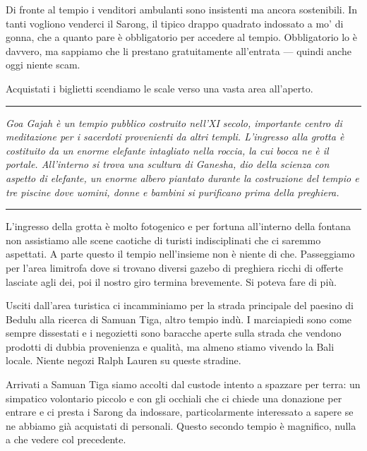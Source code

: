 Di fronte al tempio i venditori ambulanti sono insistenti ma ancora sostenibili. In tanti vogliono venderci il Sarong, il tipico drappo quadrato indossato a mo' di gonna, che a quanto pare è obbligatorio per accedere al tempio. Obbligatorio lo è davvero, ma sappiamo che li prestano gratuitamente all'entrata — quindi anche oggi niente scam. 

Acquistati i biglietti scendiamo le scale verso una vasta area all'aperto. 

\begin{center}
    \noindent\rule{0.6\textwidth}{0.4pt}
\end{center}

\textit{Goa Gajah è un tempio pubblico costruito nell'XI secolo, importante centro di meditazione per i sacerdoti provenienti da altri templi. L'ingresso alla grotta è costituito da un enorme elefante intagliato nella roccia, la cui bocca ne è il portale. All'interno si trova una scultura di Ganesha, dio della scienza con aspetto di elefante, un enorme albero piantato durante la costruzione del tempio e tre piscine dove uomini, donne e bambini si purificano prima della preghiera.}

\begin{center}
    \noindent\rule{0.6\textwidth}{0.4pt}
\end{center}

L'ingresso della grotta è molto fotogenico e per fortuna all'interno della fontana non assistiamo alle scene caotiche di turisti indisciplinati che ci saremmo aspettati. A parte questo il tempio nell'insieme non è niente di che. Passeggiamo per l'area limitrofa dove si trovano diversi gazebo di preghiera ricchi di offerte lasciate agli dei, poi il nostro giro termina brevemente. Si poteva fare di più.

Usciti dall'area turistica ci incamminiamo per la strada principale del paesino di Bedulu alla ricerca di Samuan Tiga, altro tempio indù. I marciapiedi sono come sempre dissestati e i negozietti sono baracche aperte sulla strada che vendono prodotti di dubbia provenienza e qualità, ma almeno stiamo vivendo la Bali locale. Niente negozi Ralph Lauren su queste stradine.

Arrivati a Samuan Tiga siamo accolti dal custode intento a spazzare per terra: un simpatico volontario piccolo e con gli occhiali che ci chiede una donazione per entrare e ci presta i Sarong da indossare, particolarmente interessato a sapere se ne abbiamo già acquistati di personali. Questo secondo tempio è magnifico, nulla a che vedere col precedente.

